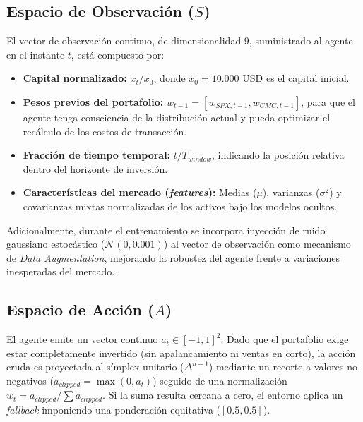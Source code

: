 \subsection{Espacio de Observación ($S$)}
El vector de observación continuo, de dimensionalidad 9, suministrado al agente en el instante $t$, está compuesto por:
\begin{itemize}
    \item \textbf{Capital normalizado:} $x_t / x_0$, donde $x_0 = 10.000$ USD es el capital inicial.
    \item \textbf{Pesos previos del portafolio:} $w_{t-1} = [w_{SPX, t-1}, w_{CMC, t-1}]$, para que el agente tenga consciencia de la distribución actual y pueda optimizar el recálculo de los costos de transacción.
    \item \textbf{Fracción de tiempo temporal:} $t / T_{window}$, indicando la posición relativa dentro del horizonte de inversión.
    \item \textbf{Características del mercado (\textit{features}):} Medias ($\mu$), varianzas ($\sigma^2$) y covarianzas mixtas normalizadas de los activos bajo los modelos ocultos.
\end{itemize}
Adicionalmente, durante el entrenamiento se incorpora inyección de ruido gaussiano estocástico ($\mathcal{N}(0, 0.001)$) al vector de observación como mecanismo de \textit{Data Augmentation}, mejorando la robustez del agente frente a variaciones inesperadas del mercado.

\subsection{Espacio de Acción ($A$)}
El agente emite un vector continuo $a_t \in [-1, 1]^2$. Dado que el portafolio exige estar completamente invertido (sin apalancamiento ni ventas en corto), la acción cruda es proyectada al símplex unitario ($\Delta^{n-1}$) mediante un recorte a valores no negativos ($a_{clipped} = \max(0, a_t)$) seguido de una normalización $w_t = a_{clipped} / \sum a_{clipped}$. Si la suma resulta cercana a cero, el entorno aplica un \textit{fallback} imponiendo una ponderación equitativa ($[0.5, 0.5]$).

